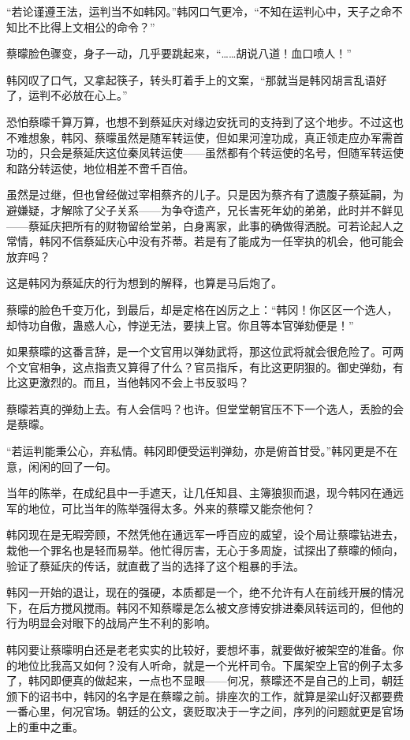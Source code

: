 “若论谨遵王法，运判当不如韩冈。”韩冈口气更冷，“不知在运判心中，天子之命不知比不比得上文相公的命令？”

蔡曚脸色骤变，身子一动，几乎要跳起来，“……胡说八道！血口喷人！”

韩冈叹了口气，又拿起筷子，转头盯着手上的文案，“那就当是韩冈胡言乱语好了，运判不必放在心上。”

恐怕蔡曚千算万算，也想不到蔡延庆对缘边安抚司的支持到了这个地步。不过这也不难想象，韩冈、蔡曚虽然是随军转运使，但如果河湟功成，真正领走应办军需首功的，只会是蔡延庆这位秦凤转运使——虽然都有个转运使的名号，但随军转运使和路分转运使，地位相差不啻千百倍。

虽然是过继，但也曾经做过宰相蔡齐的儿子。只是因为蔡齐有了遗腹子蔡延嗣，为避嫌疑，才解除了父子关系——为争夺遗产，兄长害死年幼的弟弟，此时并不鲜见——蔡延庆把所有的财物留给堂弟，白身离家，此事的确做得洒脱。可若论起人之常情，韩冈不信蔡延庆心中没有芥蒂。若是有了能成为一任宰执的机会，他可能会放弃吗？

这是韩冈为蔡延庆的行为想到的解释，也算是马后炮了。

蔡曚的脸色千变万化，到最后，却是定格在凶厉之上：“韩冈！你区区一个选人，却恃功自傲，蛊惑人心，悖逆无法，要挟上官。你且等本官弹劾便是！”

如果蔡曚的这番言辞，是一个文官用以弹劾武将，那这位武将就会很危险了。可两个文官相争，这点指责又算得了什么？官员指斥，有比这更阴狠的。御史弹劾，有比这更激烈的。而且，当他韩冈不会上书反驳吗？

蔡曚若真的弹劾上去。有人会信吗？也许。但堂堂朝官压不下一个选人，丢脸的会是蔡曚。

“若运判能秉公心，弃私情。韩冈即便受运判弹劾，亦是俯首甘受。”韩冈更是不在意，闲闲的回了一句。

当年的陈举，在成纪县中一手遮天，让几任知县、主簿狼狈而退，现今韩冈在通远军的地位，可比当年的陈举强得太多。外来的蔡曚又能奈他何？

韩冈现在是无暇旁顾，不然凭他在通远军一呼百应的威望，设个局让蔡曚钻进去，栽他一个罪名也是轻而易举。他忙得厉害，无心于多周旋，试探出了蔡曚的倾向，验证了蔡延庆的传话，就直截了当的选择了这个粗暴的手法。

韩冈一开始的退让，现在的强硬，本质都是一个，绝不允许有人在前线开展的情况下，在后方搅风搅雨。韩冈不知蔡曚是怎么被文彦博安排进秦凤转运司的，但他的行为明显会对眼下的战局产生不利的影响。

韩冈要让蔡曚明白还是老老实实的比较好，要想坏事，就要做好被架空的准备。你的地位比我高又如何？没有人听命，就是一个光杆司令。下属架空上官的例子太多了，韩冈即便真的做起来，一点也不显眼——何况，蔡曚还不是自己的上司，朝廷颁下的诏书中，韩冈的名字是在蔡曚之前。排座次的工作，就算是梁山好汉都要费一番心里，何况官场。朝廷的公文，褒贬取决于一字之间，序列的问题就更是官场上的重中之重。

